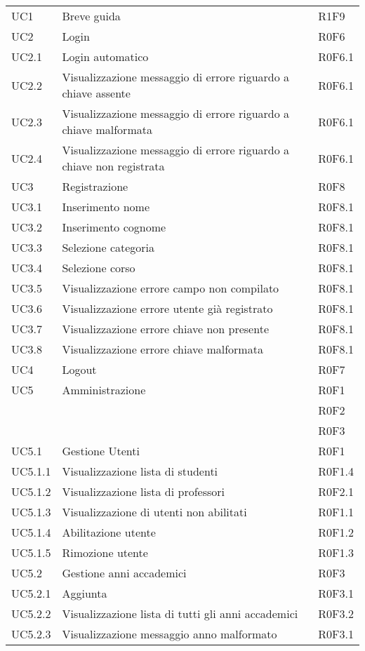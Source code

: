 \documentclass[AnalisiDeiRequisiti.tex]{subfiles}
\begin{document}
\begin{longtable}[H]{p{2cm}p{5cm}p{5cm}}
	UC1 & Breve guida & R1F9 \\  
	UC2 & Login & R0F6 \\  
	UC2.1 & Login automatico & R0F6.1 \\  
	UC2.2 & Visualizzazione messaggio di errore riguardo a chiave assente & R0F6.1 \\  
	UC2.3 & Visualizzazione messaggio di errore riguardo a chiave malformata & R0F6.1 \\  
	UC2.4 & Visualizzazione messaggio di errore riguardo a chiave non registrata & R0F6.1 \\  
	UC3 & Registrazione & R0F8 \\   %
	UC3.1 & Inserimento nome & R0F8.1 \\  
	UC3.2 & Inserimento cognome & R0F8.1 \\  
	UC3.3 & Selezione categoria & R0F8.1 \\  
	UC3.4 & Selezione corso & R0F8.1 \\  
	UC3.5 & Visualizzazione errore campo non compilato & R0F8.1 \\  
	UC3.6 & Visualizzazione errore utente già registrato & R0F8.1 \\  
	UC3.7 & Visualizzazione errore chiave non presente & R0F8.1 \\  
	UC3.8 & Visualizzazione errore chiave malformata & R0F8.1 \\  
	UC4 & Logout & R0F7 \\  
	UC5 & Amministrazione &  R0F1 \\ 
	& & R0F2 \\
	& & R0F3 \\  
	UC5.1 & Gestione Utenti &  R0F1 \\  
	UC5.1.1 & Visualizzazione lista di studenti & R0F1.4 \\  
	UC5.1.2 & Visualizzazione lista di professori &  R0F2.1\\  
	UC5.1.3 & Visualizzazione di utenti non abilitati & R0F1.1 \\  
	UC5.1.4 & Abilitazione utente & R0F1.2 \\    
	UC5.1.5 & Rimozione utente & R0F1.3 \\  
	UC5.2 & Gestione anni accademici &  R0F3 \\  
	UC5.2.1 & Aggiunta \citGloss{anno accademico} &  R0F3.1 \\  
	UC5.2.2 & Visualizzazione lista di tutti gli anni accademici & R0F3.2 \\   
	UC5.2.3 & Visualizzazione messaggio anno malformato & R0F3.1 \\  

\end{longtable}
\end{document}
